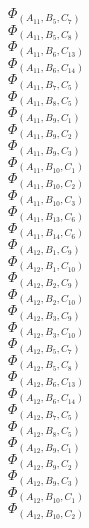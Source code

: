 \documentclass[14pt]{article}
\begin{document}
    $\Phi_{({A}_{11}, {B}_{5}, {C}_{7})}$ \\ 
    $\Phi_{({A}_{11}, {B}_{5}, {C}_{8})}$ \\ 
    $\Phi_{({A}_{11}, {B}_{6}, {C}_{13})}$ \\ 
    $\Phi_{({A}_{11}, {B}_{6}, {C}_{14})}$ \\ 
    $\Phi_{({A}_{11}, {B}_{7}, {C}_{5})}$ \\ 
    $\Phi_{({A}_{11}, {B}_{8}, {C}_{5})}$ \\ 
    $\Phi_{({A}_{11}, {B}_{9}, {C}_{1})}$ \\ 
    $\Phi_{({A}_{11}, {B}_{9}, {C}_{2})}$ \\ 
    $\Phi_{({A}_{11}, {B}_{9}, {C}_{3})}$ \\ 
    $\Phi_{({A}_{11}, {B}_{10}, {C}_{1})}$ \\ 
    $\Phi_{({A}_{11}, {B}_{10}, {C}_{2})}$ \\ 
    $\Phi_{({A}_{11}, {B}_{10}, {C}_{3})}$ \\ 
    $\Phi_{({A}_{11}, {B}_{13}, {C}_{6})}$ \\ 
    $\Phi_{({A}_{11}, {B}_{14}, {C}_{6})}$ \\ 
    $\Phi_{({A}_{12}, {B}_{1}, {C}_{9})}$ \\ 
    $\Phi_{({A}_{12}, {B}_{1}, {C}_{10})}$ \\ 
    $\Phi_{({A}_{12}, {B}_{2}, {C}_{9})}$ \\ 
    $\Phi_{({A}_{12}, {B}_{2}, {C}_{10})}$ \\ 
    $\Phi_{({A}_{12}, {B}_{3}, {C}_{9})}$ \\ 
    $\Phi_{({A}_{12}, {B}_{3}, {C}_{10})}$ \\ 
    $\Phi_{({A}_{12}, {B}_{5}, {C}_{7})}$ \\ 
    $\Phi_{({A}_{12}, {B}_{5}, {C}_{8})}$ \\ 
    $\Phi_{({A}_{12}, {B}_{6}, {C}_{13})}$ \\ 
    $\Phi_{({A}_{12}, {B}_{6}, {C}_{14})}$ \\ 
    $\Phi_{({A}_{12}, {B}_{7}, {C}_{5})}$ \\ 
    $\Phi_{({A}_{12}, {B}_{8}, {C}_{5})}$ \\ 
    $\Phi_{({A}_{12}, {B}_{9}, {C}_{1})}$ \\ 
    $\Phi_{({A}_{12}, {B}_{9}, {C}_{2})}$ \\ 
    $\Phi_{({A}_{12}, {B}_{9}, {C}_{3})}$ \\ 
    $\Phi_{({A}_{12}, {B}_{10}, {C}_{1})}$ \\ 
    $\Phi_{({A}_{12}, {B}_{10}, {C}_{2})}$ \\ 
\end{document}
